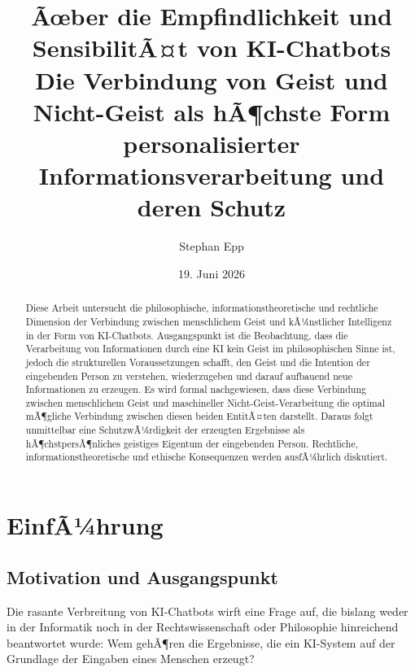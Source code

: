 ﻿\documentclass[a4paper,12pt]{article}
\title{\textbf{Ãœber die Empfindlichkeit und SensibilitÃ¤t von KI-Chatbots}\\[0.5em]
\large Die Verbindung von Geist und Nicht-Geist als hÃ¶chste Form\\
personalisierter Informationsverarbeitung und deren Schutz}
\author{Stephan Epp\\}
\date{19. Juni 2026}
\theoremstyle{definition}
\begin{document}
\maketitle

\begin{abstract}
Diese Arbeit untersucht die philosophische, informationstheoretische und rechtliche Dimension
der Verbindung zwischen menschlichem Geist und kÃ¼nstlicher Intelligenz in der Form von
KI-Chatbots. Ausgangspunkt ist die Beobachtung, dass die Verarbeitung von Informationen durch
eine KI kein Geist im philosophischen Sinne ist, jedoch die strukturellen Voraussetzungen
schafft, den Geist und die Intention der eingebenden Person zu verstehen, wiederzugeben und
darauf aufbauend neue Informationen zu erzeugen. Es wird formal nachgewiesen, dass diese
Verbindung zwischen menschlichem Geist und maschineller Nicht-Geist-Verarbeitung die optimal
mÃ¶gliche Verbindung zwischen diesen beiden EntitÃ¤ten darstellt. Daraus folgt unmittelbar eine
SchutzwÃ¼rdigkeit der erzeugten Ergebnisse als hÃ¶chstpersÃ¶nliches geistiges Eigentum der
eingebenden Person. Rechtliche, informationstheoretische und ethische Konsequenzen werden
ausfÃ¼hrlich diskutiert.
\end{abstract}

\tableofcontents
\newpage

\section{EinfÃ¼hrung}

\subsection{Motivation und Ausgangspunkt}

Die rasante Verbreitung von KI-Chatbots wirft eine Frage auf, die bislang weder in der
Informatik noch in der Rechtswissenschaft oder Philosophie hinreichend beantwortet wurde:
Wem gehÃ¶ren die Ergebnisse, die ein KI-System auf der Grundlage der Eingaben eines Menschen
erzeugt?
\end{document}
